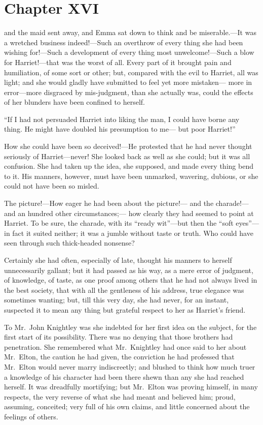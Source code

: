 \chapter{Chapter XVI}


 and the maid sent away, and Emma sat down to think
and be miserable.---It was a wretched business indeed!---Such an overthrow
of every thing she had been wishing for!---Such a development of every
thing most unwelcome!---Such a blow for Harriet!---that was the worst
of all.  Every part of it brought pain and humiliation, of some sort
or other; but, compared with the evil to Harriet, all was light;
and she would gladly have submitted to feel yet more mistaken---%
more in error---more disgraced by mis-judgment, than she actually was,
could the effects of her blunders have been confined to herself.

``If I had not persuaded Harriet into liking the man, I could have
borne any thing.  He might have doubled his presumption to me---%
but poor Harriet!''

How she could have been so deceived!---He protested that he
had never thought seriously of Harriet---never!  She looked back
as well as she could; but it was all confusion.  She had taken
up the idea, she supposed, and made every thing bend to it.
His manners, however, must have been unmarked, wavering, dubious,
or she could not have been so misled.

The picture!---How eager he had been about the picture!---%
and the charade!---and an hundred other circumstances;---%
how clearly they had seemed to point at Harriet.  To be sure,
the charade, with its ``ready wit''---but then the ``soft eyes''---%
in fact it suited neither; it was a jumble without taste or truth.
Who could have seen through such thick-headed nonsense?

Certainly she had often, especially of late, thought his manners
to herself unnecessarily gallant; but it had passed as his way,
as a mere error of judgment, of knowledge, of taste, as one proof
among others that he had not always lived in the best society,
that with all the gentleness of his address, true elegance
was sometimes wanting; but, till this very day, she had never,
for an instant, suspected it to mean any thing but grateful respect
to her as Harriet's friend.

To Mr.\ John Knightley was she indebted for her first idea on
the subject, for the first start of its possibility.  There was
no denying that those brothers had penetration.  She remembered
what Mr.\ Knightley had once said to her about Mr.\ Elton, the caution
he had given, the conviction he had professed that Mr.\ Elton would
never marry indiscreetly; and blushed to think how much truer
a knowledge of his character had been there shewn than any she
had reached herself.  It was dreadfully mortifying; but Mr.\ Elton
was proving himself, in many respects, the very reverse of what she
had meant and believed him; proud, assuming, conceited; very full
of his own claims, and little concerned about the feelings of others.


